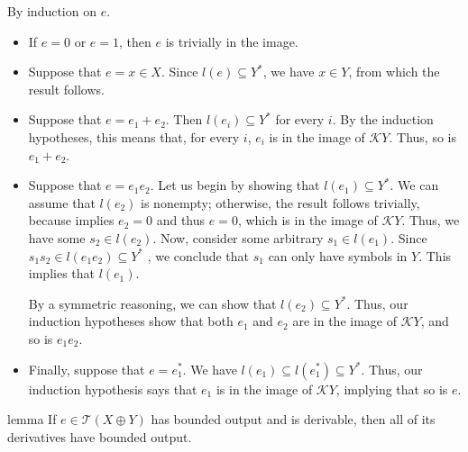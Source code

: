 \documentclass[a4paper,UKenglish,cleveref, autoref, thm-restate]{lipics-v2021}
\begin{document}
\begin{proofEnd}
  By induction on $e$.
  \begin{itemize}
  \item If $e = 0$ or $e = 1$, then $e$ is trivially in the image.
  \item Suppose that $e = x  \in  X$.  Since $l(e)  \subseteq  Y^*$, we have $x  \in  Y$, from
    which the result follows.
  \item Suppose that $e = e_{1} + e_{2}$.  Then $l(e_i)  \subseteq  Y^*$ for every $i$.  By the
    induction hypotheses, this means that, for every $i$, $e_i$ is in the image
    of $\mathcal{K}Y$.  Thus, so is $e_{1} + e_{2}$.
  \item Suppose that $e = e_{1}e_{2}$.  Let us begin by showing that $l(e_1)  \subseteq  Y^*$.
    We can assume that $l(e_{2})$ is nonempty; otherwise, the result follows
    trivially, because  implies $e_2 = 0$ and thus
    $e = 0$, which is in the image of $\mathcal{K}Y$.  Thus, we have some
    $s_2  \in  l(e_2)$.  Now, consider some arbitrary $s_1  \in  l(e_1)$.  Since
    $s_1s_2  \in  l(e_1e_2)  \subseteq  Y^*$ , we conclude that $s_1$ can only have symbols in
    $Y$.  This implies that $l(e_1)$.

    By a symmetric reasoning, we can show that $l(e_2)  \subseteq  Y^*$.  Thus, our
    induction hypotheses show that both $e_1$ and $e_2$ are in the image of
    $\mathcal{K}Y$, and so is $e_1e_2$.
  \item Finally, suppose that $e = e_{1}^*$.  We have $l(e_{1})  \subseteq  l(e_{1}^*)  \subseteq  Y^*$.
    Thus, our induction hypothesis says that $e_1$ is in the image of
    $\mathcal{K}Y$, implying that so is $e$.
  \end{itemize}
\end{proofEnd}

\begin{theoremEnd}{lemma}
  \label{lem:bounded-output-derivative}
  If $e  \in  \mathcal{T}(X  \oplus  Y)$ has bounded output and is derivable, then all of
  its derivatives have bounded output.
\end{theoremEnd}
\end{document}
